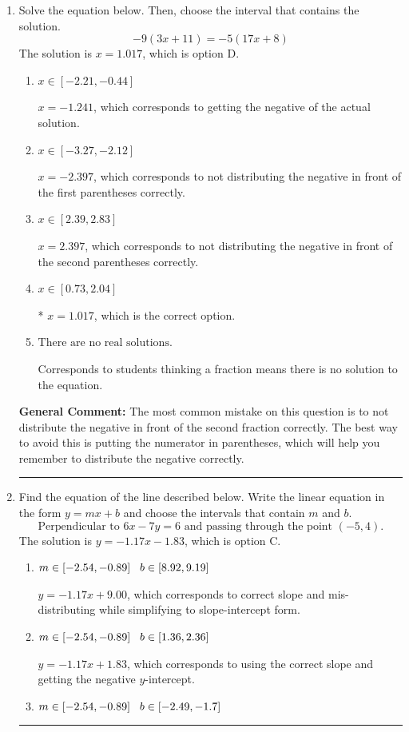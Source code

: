 \documentclass{extbook}[14pt]
\newcommand{\litem}[1]{\item #1

\rule{\textwidth}{0.4pt}}
\begin{document}
\begin{enumerate}\litem{
Solve the equation below. Then, choose the interval that contains the solution.
\[ -9(3x + 11) = -5(17x + 8) \]The solution is \( x = 1.017 \), which is option D.\begin{enumerate}[label=\Alph*.]
\item \( x \in [-2.21, -0.44] \)

$x = -1.241$, which corresponds to getting the negative of the actual solution.
\item \( x \in [-3.27, -2.12] \)

$x = -2.397$, which corresponds to not distributing the negative in front of the first parentheses correctly.
\item \( x \in [2.39, 2.83] \)

$x = 2.397$, which corresponds to not distributing the negative in front of the second parentheses correctly.
\item \( x \in [0.73, 2.04] \)

* $x = 1.017$, which is the correct option.
\item \( \text{There are no real solutions.} \)

Corresponds to students thinking a fraction means there is no solution to the equation.
\end{enumerate}

\textbf{General Comment:} The most common mistake on this question is to not distribute the negative in front of the second fraction correctly. The best way to avoid this is putting the numerator in parentheses, which will help you remember to distribute the negative correctly.
}
\litem{
Find the equation of the line described below. Write the linear equation in the form $ y=mx+b $ and choose the intervals that contain $m$ and $b$.
\[ \text{Perpendicular to } 6 x - 7 y = 6 \text{ and passing through the point } (-5, 4). \]The solution is \( y = -1.17x - 1.83 \), which is option C.\begin{enumerate}[label=\Alph*.]
\item \( m \in [-2.54, -0.89] \hspace*{3mm} b \in [8.92, 9.19] \)

 $y = -1.17x + 9.00$, which corresponds to correct slope and mis-distributing while simplifying to slope-intercept form.
\item \( m \in [-2.54, -0.89] \hspace*{3mm} b \in [1.36, 2.36] \)

 $y = -1.17x + 1.83$, which corresponds to using the correct slope and getting the negative $y$-intercept.
\item \( m \in [-2.54, -0.89] \hspace*{3mm} b \in [-2.49, -1.7] \)


\end{enumerate}}
\end{enumerate}
\end{document}
